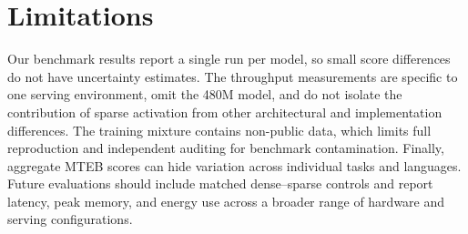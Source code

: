 \documentclass[11pt]{article}
\begin{document}
\section{Limitations}

Our benchmark results report a single run per model, so small score differences do not have uncertainty estimates.
The throughput measurements are specific to one serving environment, omit the 480M model, and do not isolate the contribution of sparse activation from other architectural and implementation differences.
The training mixture contains non-public data, which limits full reproduction and independent auditing for benchmark contamination.
Finally, aggregate MTEB scores can hide variation across individual tasks and languages.
Future evaluations should include matched dense--sparse controls and report latency, peak memory, and energy use across a broader range of hardware and serving configurations.

\FloatBarrier

\end{document}
